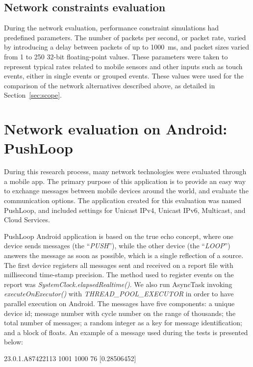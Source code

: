 \subsection*{Network constraints evaluation}

During the network evaluation, performance constraint simulations had predefined parameters.
The number of packets per second, or packet rate, varied by introducing a delay between packets of up to 1000~ms, and packet sizes varied from 1 to 250 32-bit floating-point values. These parameters were taken to represent typical rates related to mobile sensors and other inputs such as touch events, either in single events or grouped events.
These values were used for the comparison of the network alternatives described above, as detailed in Section~\ref{sec:scope}.


\section{Network evaluation on Android: PushLoop}
\label{sec:apppushloop}

During this research process, many network technologies were evaluated through a mobile app.
The primary purpose of this application is to provide an easy way to exchange messages between mobile devices around the world, and evaluate the communication options.
The application created for this evaluation was named PushLoop, and included settings for Unicast IPv4, Unicast IPv6, Multicast, and Cloud Services.

PushLoop Android application is based on the true echo concept, where one device sends messages (the ``\textit{PUSH}''), while the other device (the ``\textit{LOOP}'') answers the message as soon as possible, which is a single reflection of a source.
The first device registers all messages sent and received on a report file with millisecond time-stamp precision.
The method used to register events on the report was \textit{SystemClock.elapsedRealtime()}.
We also run AsyncTask invoking \textit{executeOnExecutor()} with \textit{THREAD\_POOL\_EXECUTOR} in order to have parallel execution on Android.
The messages have five components: a unique device id; message number with cycle number on the range of thousands; the total number of messages; a random integer as a key for message identification; and a block of floats.
An example of a message used during the tests is presented below:

\begin{footnotesize}
	\begin{center}
		23.0.1.A87422113 1001 1000 76 [0.28506452]
	\end{center}
\end{footnotesize}

